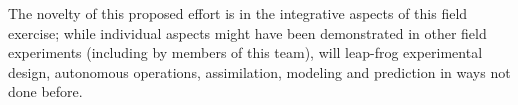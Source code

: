 The novelty of this proposed effort is in the integrative aspects of
this field exercise; while individual aspects might have been
demonstrated in other field experiments (including by members of this
team), \proj will leap-frog experimental design, autonomous
operations, assimilation, modeling and prediction in ways not done
before.


